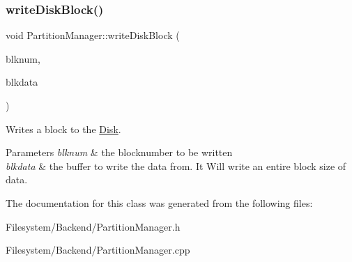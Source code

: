 \subsubsection{\texorpdfstring{write\+Disk\+Block()}{writeDiskBlock()}}
{\footnotesize\ttfamily void Partition\+Manager\+::write\+Disk\+Block (\begin{DoxyParamCaption}\item[{Blk\+Num\+Type}]{blknum,  }\item[{char $\ast$}]{blkdata }\end{DoxyParamCaption})}

Writes a block to the \mbox{\hyperlink{classDisk}{Disk}}. 
\begin{DoxyParams}{Parameters}
{\em blknum} & the blocknumber to be written \\
\hline
{\em blkdata} & the buffer to write the data from. It Will write an entire block size of data. \\
\hline
\end{DoxyParams}


The documentation for this class was generated from the following files\+:\begin{DoxyCompactItemize}
\item 
Filesystem/\+Backend/Partition\+Manager.\+h\item 
Filesystem/\+Backend/Partition\+Manager.\+cpp\end{DoxyCompactItemize}
